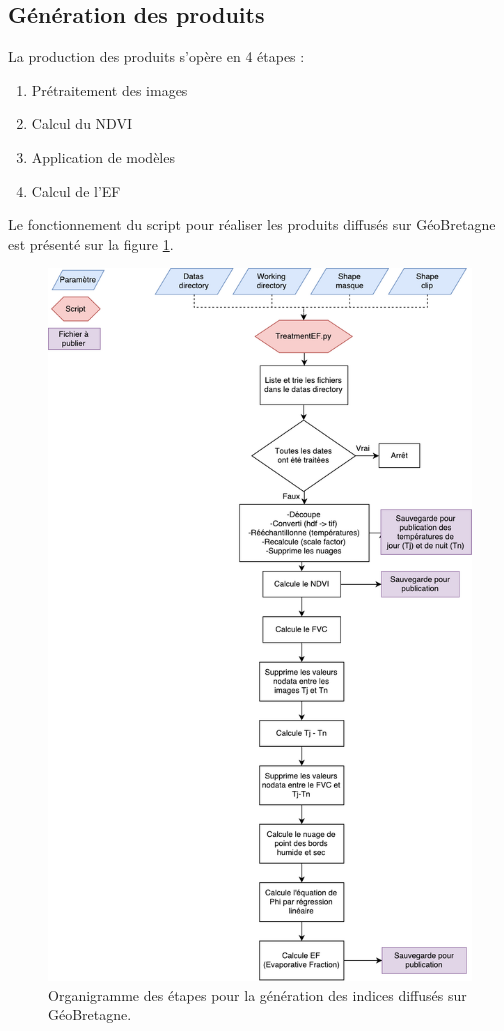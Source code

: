 \documentclass[10pt,a4paper]{article}
\begin{document}
\subsection{Génération des produits}

La production des produits s'opère en 4 étapes :

\begin{enumerate}
\item Prétraitement des images
\item Calcul du NDVI
\item Application de modèles
\item Calcul de l'EF
\end{enumerate}

Le fonctionnement du script pour réaliser les produits diffusés sur GéoBretagne est présenté sur la figure \ref{orgIndex}.\newpage

\begin{figure}[!h]
\centering
\includegraphics[scale=0.48]{img/orgIndices.pdf}
\caption{Organigramme des étapes pour la génération des indices diffusés sur GéoBretagne.}
\label{orgIndex}
\end{figure}
\end{document}

